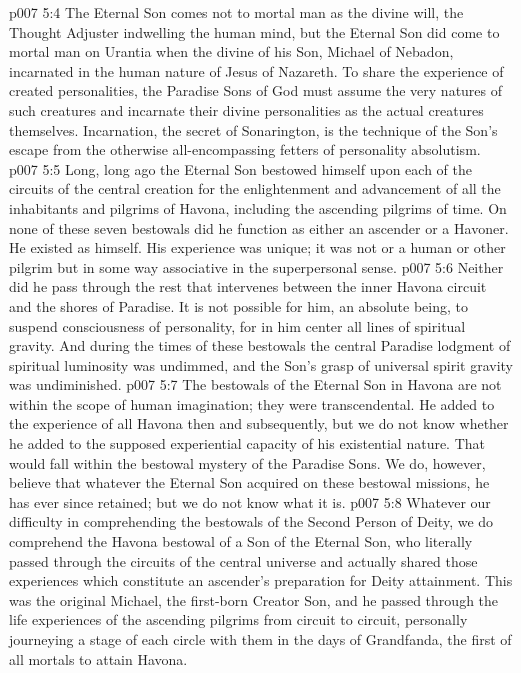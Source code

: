 \vs p007 5:4 The Eternal Son comes not to mortal man as the divine will, the Thought Adjuster indwelling the human mind, but the Eternal Son did come to mortal man on Urantia when the divine  of his Son, Michael of Nebadon, incarnated in the human nature of Jesus of Nazareth. To share the experience of created personalities, the Paradise Sons of God must assume the very natures of such creatures and incarnate their divine personalities as the actual creatures themselves. Incarnation, the secret of Sonarington, is the technique of the Son’s escape from the otherwise all\hyp{}encompassing fetters of personality absolutism.
\pc \vs p007 5:5 Long, long ago the Eternal Son bestowed himself upon each of the circuits of the central creation for the enlightenment and advancement of all the inhabitants and pilgrims of Havona, including the ascending pilgrims of time. On none of these seven bestowals did he function as either an ascender or a Havoner. He existed as himself. His experience was unique; it was not  or  a human or other pilgrim but in some way associative in the superpersonal sense.
\vs p007 5:6 Neither did he pass through the rest that intervenes between the inner Havona circuit and the shores of Paradise. It is not possible for him, an absolute being, to suspend consciousness of personality, for in him center all lines of spiritual gravity. And during the times of these bestowals the central Paradise lodgment of spiritual luminosity was undimmed, and the Son’s grasp of universal spirit gravity was undiminished.
\pc \vs p007 5:7 The bestowals of the Eternal Son in Havona are not within the scope of human imagination; they were transcendental. He added to the experience of all Havona then and subsequently, but we do not know whether he added to the supposed experiential capacity of his existential nature. That would fall within the bestowal mystery of the Paradise Sons. We do, however, believe that whatever the Eternal Son acquired on these bestowal missions, he has ever since retained; but we do not know what it is.
\pc \vs p007 5:8 Whatever our difficulty in comprehending the bestowals of the Second Person of Deity, we do comprehend the Havona bestowal of a Son of the Eternal Son, who literally passed through the circuits of the central universe and actually shared those experiences which constitute an ascender’s preparation for Deity attainment. This was the original Michael, the first\hyp{}born Creator Son, and he passed through the life experiences of the ascending pilgrims from circuit to circuit, personally journeying a stage of each circle with them in the days of Grandfanda, the first of all mortals to attain Havona.
